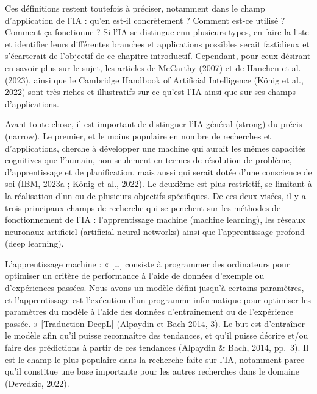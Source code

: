 \documentclass[
  letterpaper,
  DIV=11,
  numbers=noendperiod]{scrreprt}
\begin{document}
Ces définitions restent toutefois à préciser, notamment dans le champ
d'application de l'IA : qu'en est-il concrètement ? Comment est-ce
utilisé ? Comment ça fonctionne ? Si l'IA se distingue enn plusieurs
types, en faire la liste et identifier leurs différentes branches et
applications possibles serait fastidieux et s'écarterait de l'objectif
de ce chapitre introductif. Cependant, pour ceux désirant en savoir plus
sur le sujet, les articles de McCarthy (2007) et de Hanchen et al.
(2023), ainsi que le Cambridge Handbook of Artificial Intelligence
(König et al., 2022) sont très riches et illustratifs sur ce qu'est l'IA
ainsi que sur ses champs d'applications.

Avant toute chose, il est important de distinguer l'IA général (strong)
du précis (narrow). Le premier, et le moins populaire en nombre de
recherches et d'applications, cherche à développer une machine qui
aurait les mêmes capacités cognitives que l'humain, non seulement en
termes de résolution de problème, d'apprentissage et de planification,
mais aussi qui serait dotée d'une conscience de soi (IBM, 2023a ; König
et al., 2022). Le deuxième est plus restrictif, se limitant à la
réalisation d'un ou de plusieurs objectifs spécifiques. De ces deux
visées, il y a trois principaux champs de recherche qui se penchent sur
les méthodes de fonctionnement de l'IA : l'apprentissage machine
(machine learning), les réseaux neuronaux artificiel (artificial neural
networks) ainsi que l'apprentissage profond (deep learning).

L'apprentissage machine : « {[}\ldots{]} consiste à programmer des
ordinateurs pour optimiser un critère de performance à l'aide de données
d'exemple ou d'expériences passées. Nous avons un modèle défini jusqu'à
certains paramètres, et l'apprentissage est l'exécution d'un programme
informatique pour optimiser les paramètres du modèle à l'aide des
données d'entraînement ou de l'expérience passée. » {[}Traduction
DeepL{]} (Alpaydin et Bach 2014, 3). Le but est d'entraîner le modèle
afin qu'il puisse reconnaître des tendances, et qu'il puisse décrire
et/ou faire des prédictions à partir de ces tendances (Alpaydin \& Bach,
2014, pp.~3). Il est le champ le plus populaire dans la recherche faite
sur l'IA, notamment parce qu'il constitue une base importante pour les
autres recherches dans le domaine (Devedzic, 2022).
\end{document}
